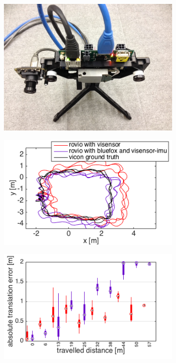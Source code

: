 \begin{figure}[h]
  \begin{subfigure}[b]{0.40\textwidth}
    \includegraphics[width=\textwidth]{images/vi_bluefox.JPG}
    \caption{}
  \end{subfigure}
  \hfill
  \begin{subfigure}[b]{0.42\textwidth}
    \includegraphics[width=\textwidth]{images/fast_fixed_2D.png}
    \caption{}
  \end{subfigure}
  \hfill
  \begin{subfigure}[b]{0.42\textwidth}
    \includegraphics[width=\textwidth]{images/fast_fixed/fast_fixed_ate.png}

\end{subfigure}
\end{figure}
